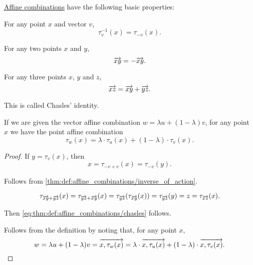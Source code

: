\begin{proposition}\label{thm:def:affine_combinations}
  \hyperref[def:affine_combinations]{Affine combinations} have the following basic properties:
  \begin{thmenum}
     For any point \( x \) and vector \( v \),
    \begin{equation*}
      \tau_v^{-1}(x) = \tau_{-v}(x).
    \end{equation*}

     For any two points \( x \) and \( y \),
    \begin{equation*}
      \overrightarrow{xy} = -\overrightarrow{xy}.
    \end{equation*}

     For any three points \( x \), \( y \) and \( z \),
    \begin{equation}\label{eq:thm:def:affine_combinations/chasles}
      \overrightarrow{xz} = \overrightarrow{xy} + \overrightarrow{yz}.
    \end{equation}

    This is called Chasles' identity.

     If we are given the vector affine combination \( w = \lambda u + (1 - \lambda) v \), for any point \( x \) we have the point affine combination
    \begin{equation*}
      \tau_w(x) = \lambda \cdot \tau_u(x) + (1 - \lambda) \cdot \tau_v(x).
    \end{equation*}
  \end{thmenum}
\end{proposition}
\begin{proof}
   If \( y = \tau_v(x) \), then
  \begin{equation*}
    x = \tau_{-v + v}(x) = \tau_{-v}(y).
  \end{equation*}

   Follows from \cref{thm:def:affine_combinations/inverse_of_action}.

  \begin{equation*}
    \tau_{\overrightarrow{xy} + \overrightarrow{yz}}(x)
    =
    \tau_{\overrightarrow{yz} + \overrightarrow{xy}}(x)
    =
    \tau_{\overrightarrow{yz}}(\tau_{\overrightarrow{xy}}(x))
    =
    \tau_{\overrightarrow{yz}}(y)
    =
    z
    =
    \tau_{\overrightarrow{xz}}(x).
  \end{equation*}

  Then \eqref{eq:thm:def:affine_combinations/chasles} follows.

   Follows from the definition by noting that, for any point \( x \),
  \begin{equation*}
    w = \lambda u + (1 - \lambda) v
    =
    \overrightarrow{x, \tau_w(x)} = \lambda \cdot \overrightarrow{x, \tau_u(x)} + (1 - \lambda) \cdot \overrightarrow{x, \tau_v(x)}.
  \end{equation*}
\end{proof}

